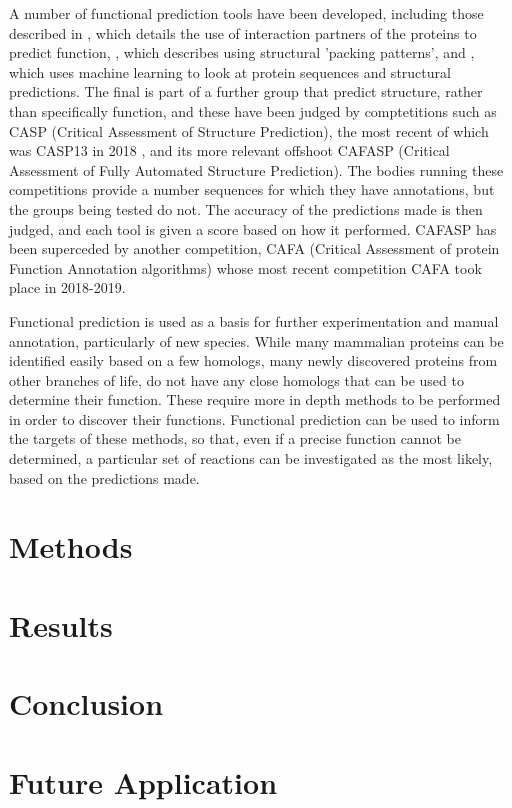 \documentclass[12pt]{report}
\begin{document}
		A number of functional prediction tools have been developed, including those described in \cite{RefWorks:doc:5d822c8ce4b07f40b9eae1b7}, which details the use of interaction partners of the proteins to predict function, \cite{RefWorks:doc:5d822cfce4b0506e9759e8f8}, which describes using structural 'packing patterns', and \cite{RefWorks:doc:5d822dd5e4b07f40b9eae2f4}, which uses machine learning to look at protein sequences and structural predictions.  The final is part of a further group that predict structure, rather than specifically function, and these have been judged by comptetitions such as CASP (Critical Assessment of Structure Prediction), the most recent of which was CASP13 in 2018 \citep{RefWorks:doc:5d822fa4e4b0fa10423c5184}, and its more relevant offshoot CAFASP (Critical Assessment of Fully Automated Structure Prediction).  The bodies running these competitions provide a number sequences for which they have annotations, but the groups being tested do not.  The accuracy of the predictions made is then judged, and each tool is given a score based on how it performed.  CAFASP has been superceded by another competition, CAFA (Critical Assessment of protein Function Annotation algorithms) \citep{RefWorks:doc:5d82345ae4b09beeb95d60bb} whose most recent competition CAFA took place in 2018-2019.%
		
		Functional prediction is used as a basis for further experimentation and manual annotation, particularly of new species.  While many mammalian proteins can be identified easily based on a few homologs, many newly discovered proteins from other branches of life, do not have any close homologs that can be used to determine their function.  These require more in depth methods to be performed in order to discover their functions.  Functional prediction can be used to inform the targets of these methods, so that, even if a precise function cannot be determined, a particular set of reactions can be investigated as the most likely, based on the predictions made. %
		
	\section{Methods}
		
		
		
	\section{Results}
		
		
				
	\section{Conclusion}
		
		
		
	\section{Future Application}
		
	
	{}
	
\end{document}
